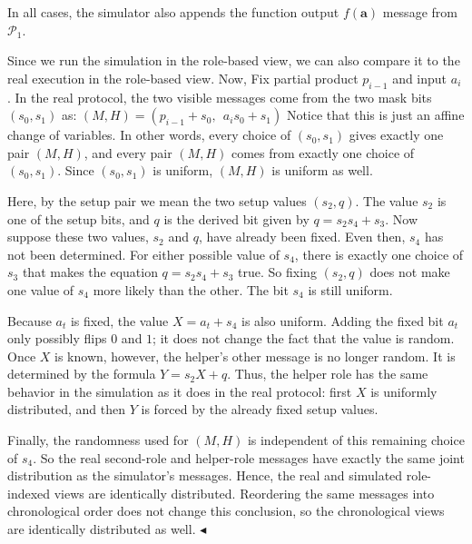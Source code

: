 In all cases, the simulator also appends the function output $f(\mathbf{a})$ message from $\mathcal{P}_{1}$.\par




Since we run the simulation in the role-based view, we can also compare it to the real execution in the role-based view. Now, Fix partial product $p_{i-1}$ and input $a_{i}$. In the real protocol, the two visible messages come from the two mask bits $(s_{0},s_{1})$ as:
$(M,H)=(p_{i-1}+s_{0},\ \ a_{i}s_{0}+s_{1})$
Notice that this is just an affine change of variables. In other words, every choice of $(s_{0},s_{1})$ gives exactly one pair $(M,H)$, and every pair $(M,H)$ comes from exactly one choice of $(s_{0},s_{1})$. Since $(s_{0},s_{1})$ is uniform, $(M,H)$ is uniform as well.\par




Here, by the setup pair we mean the two setup values $(s_{2},q)$. The value $s_{2}$ is one of the setup bits, and $q$ is the derived bit given by $q=s_{2}s_{4}+s_{3}$. Now suppose these two values, $s_{2}$ and $q$, have already been fixed. Even then, $s_{4}$ has not been determined. For either possible value of $s_{4}$, there is exactly one choice of $s_{3}$ that makes the equation $q=s_{2}s_{4}+s_{3}$ true. So fixing $(s_{2},q)$ does not make one value of $s_{4}$ more likely than the other. The bit $s_{4}$ is still uniform.\par




Because $a_{t}$ is fixed, the value $X=a_{t}+s_{4}$ is also uniform. Adding the fixed bit $a_{t}$ only possibly flips $0$ and $1$; it does not change the fact that the value is random. Once $X$ is known, however, the helper’s other message is no longer random. It is determined by the formula $Y=s_{2}X+q$. Thus, the helper role has the same behavior in the simulation as it does in the real protocol: first $X$ is uniformly distributed, and then $Y$ is forced by the already fixed setup values.\par




Finally, the randomness used for $(M,H)$ is independent of this remaining choice of $s_{4}$. So the real second-role and helper-role messages have exactly the same joint distribution as the simulator’s messages. Hence, the real and simulated role-indexed views are identically distributed. Reordering the same messages into chronological order does not change this conclusion, so the chronological views are identically distributed as well.
$\blacktriangleleft$\par








